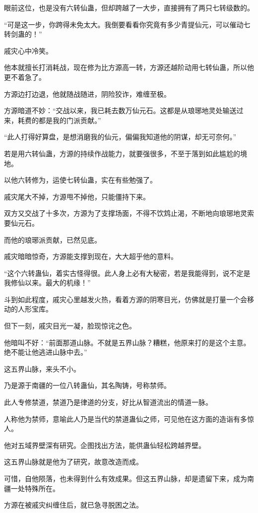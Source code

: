 \begin{this_body}
眼前这位，也是没有六转仙蛊，但却跨越了一大步，直接拥有了两只七转级数的。

“可是这一步，你跨得未免太大。我倒要看看你究竟有多少青提仙元，可以催动七转剑蛊的！”

戚灾心中冷笑。

他本就擅长打消耗战，现在修为比方源高一转，方源还越阶动用七转仙蛊，所以他更不着急了。

方源边打边退，他就随战随进，阴险狡诈，难缠至极。

方源暗道不妙：“交战以来，我已耗去数万仙元石。这都是从琅琊地灵处输送过来，耗费的都是我的门派贡献。”

“此人打得好算盘，是想消磨我的仙元，偏偏我知道他的阴谋，却无可奈何。”

若是用六转仙蛊，方源的持续作战能力，就要强很多，不至于落到如此尴尬的境地。

以他六转修为，运使七转仙蛊，实在有些勉强了。

戚灾尾大不掉，方源甩不掉他，只能僵持下来。

双方又交战了十多次，方源为了支撑场面，不得不饮鸩止渴，不断地向琅琊地灵索要仙元石。

而他的琅琊派贡献，已然见底。

戚灾暗暗惊奇，方源能支撑到现在，大大超乎他的意料。

“这个六转蛊仙，着实古怪得很。此人身上必有大秘密，若是我能得到，说不定是我修仙以来。最大的机缘！”

斗到如此程度，戚灾心里越发火热，看着方源的阴寒目光，仿佛就是打量一个会移动的人形宝库。

但下一刻，戚灾目光一凝，脸现惊诧之色。

他暗叫不好：“前面那道山脉。不就是五界山脉？糟糕，他原来打的是这个主意。绝不能让他逃进山脉中去。”

这五界山脉，来头不小。

乃是源于南疆的一位八转蛊仙，其名陶铸，号称禁师。

此人专修禁道，禁道乃是律道的分支，好比从智道流出的情道一脉。

人称他为禁师，意喻此人乃是当代的禁道蛊仙之师，可见他在这方面的造诣有多惊人。

他对五域界壁深有研究。企图找出方法，能供蛊仙轻松跨越界壁。

这五界山脉就是他为了研究，故意改造而成。

可惜，自他陨落，也未得到什么有效成果。但这五界山脉，却是遗留下来，成为南疆一处特殊所在。

方源在被戚灾纠缠住后，就已急寻脱困之法。


\end{this_body}

